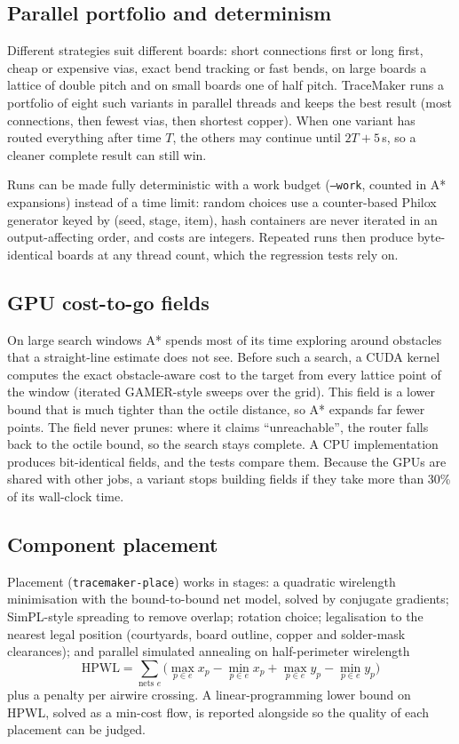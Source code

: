 \documentclass[10pt,a4paper]{article}
\begin{document}
\subsection{Parallel portfolio and determinism}

Different strategies suit different boards: short connections first or long first, cheap or expensive vias,
exact bend tracking or fast bends, on large boards a lattice of double pitch and on small boards one of half
pitch. TraceMaker runs a portfolio of
eight such variants in parallel threads and keeps the best result (most connections, then fewest vias, then
shortest copper). When one variant has routed everything after time $T$, the others may continue until $2T + 5$\,s, so
a cleaner complete result can still win.

Runs can be made fully deterministic with a work budget (\texttt{--work}, counted in A* expansions) instead of a
time limit: random choices use a counter-based Philox generator keyed by (seed, stage, item), hash containers are
never iterated in an output-affecting order, and costs are integers. Repeated runs then produce byte-identical
boards at any thread count, which the regression tests rely on.

\subsection{GPU cost-to-go fields}
\label{sec:gpu}

On large search windows A* spends most of its time exploring around obstacles that a straight-line estimate does
not see. Before such a search, a CUDA kernel computes the exact obstacle-aware cost to the target from every
lattice point of the window (iterated GAMER-style sweeps over the grid). This field is a lower bound that is much
tighter than the octile distance, so A* expands far fewer points. The field never prunes: where it claims
``unreachable'', the router falls back to the octile bound, so the search stays complete. A CPU implementation
produces bit-identical fields, and the tests compare them. Because the GPUs are shared with other jobs, a variant
stops building fields if they take more than 30\% of its wall-clock time.

\subsection{Component placement}

Placement (\texttt{tracemaker-place}) works in stages: a quadratic wirelength minimisation with the bound-to-bound
net model, solved by conjugate gradients; SimPL-style spreading to remove overlap; rotation choice; legalisation to
the nearest legal position (courtyards, board outline, copper and solder-mask clearances); and parallel simulated
annealing on half-perimeter wirelength
\begin{equation}
  \mathrm{HPWL} = \sum_{\text{nets } e} \Big(\max_{p\in e} x_p - \min_{p\in e} x_p + \max_{p\in e} y_p - \min_{p\in e} y_p\Big)
\end{equation}
plus a penalty per airwire crossing. A linear-programming lower bound on HPWL, solved as a min-cost flow, is reported
alongside so the quality of each placement can be judged.
\end{document}
